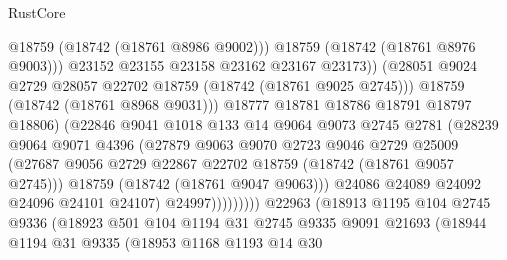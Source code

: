 \begin{lexlean}{RustCore}
\begin{coremodule}
                                    @18759
                                    (@18742 (@18761 @8986 @9002)))
                                  @18759
                                  (@18742 (@18761 @8976 @9003)))
                                @23152
                                @23155
                                @23158
                                @23162
                                @23167
                                @23173))
                            (@28051 @9024 @2729 @28057 @22702 @18759 (@18742 (@18761 @9025 @2745)))
                            @18759
                            (@18742 (@18761 @8968 @9031)))
                          @18777
                          @18781
                          @18786
                          @18791
                          @18797
                          @18806)
                        (@22846
                          @9041
                          @1018
                          @133
                          @14
                          @9064
                          @9073
                          @2745
                          @2781
                          (@28239
                            @9064
                            @9071
                            @4396
                            (@27879
                              @9063
                              @9070
                              @2723
                              @9046
                              @2729
                              @25009
                              (@27687
                                @9056
                                @2729
                                @22867
                                @22702
                                @18759
                                (@18742 (@18761 @9057 @2745)))
                              @18759
                              (@18742 (@18761 @9047 @9063)))
                            @24086
                            @24089
                            @24092
                            @24096
                            @24101
                            @24107)
                          @24997)))))))))
        @22963
        (@18913
          @1195
          @104
          @2745
          @9336
          (@18923
            @501
            @104
            @1194
            @31
            @2745
            @9335
            @9091
            @21693
            (@18944
              @1194
              @31
              @9335
              (@18953
                @1168
                @1193
                @14
                @30

\end{coremodule}
\end{lexlean}
